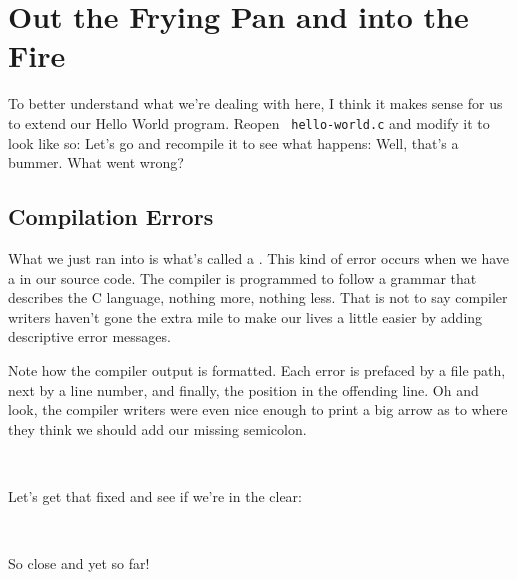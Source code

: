 \section{Out the Frying Pan and into the Fire}

To better understand what we're dealing with here, I think it makes
sense for us to extend our Hello World program.  Reopen \texttt{%
hello-world.c} and modify it to look like so:
\noindent
Let's go and recompile it to see what happens:
\noindent
Well, that's a bummer.  What went wrong?

\subsection{Compilation Errors}

What we just ran into is what's called a .
This kind of error occurs when we have a  in our
source code.  The compiler is programmed to follow a grammar that
describes the C language, nothing more, nothing less.  That is not to
say compiler writers haven't gone the extra mile to make our lives a
little easier by adding descriptive error messages.

Note how the compiler output is formatted.  Each error is prefaced by a
file path, next by a line number, and finally, the position in the
offending line.  Oh and look, the compiler writers were even nice enough
to print a big arrow as to where they think we should add our missing
semicolon.

\

\noindent
Let's get that fixed and see if we're in the clear:
\noindent
{}
\noindent
{}
\noindent

\

\noindent
So close and yet so far!
